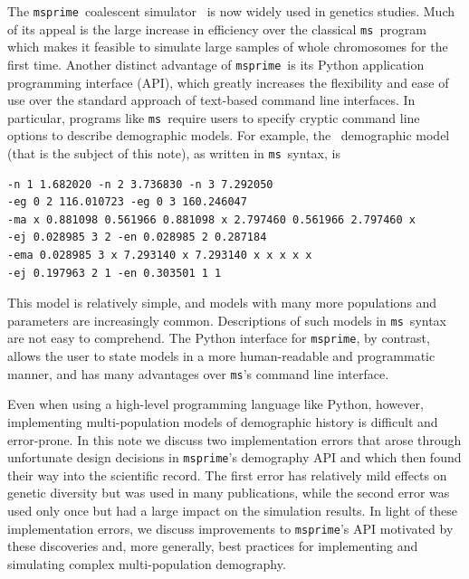 \documentclass{article}
\newcommand{\msprime}[0]{\texttt{msprime}}
\newcommand{\ms}[0]{\texttt{ms}}
\begin{document}
The \msprime\ coalescent
simulator~\citep{kelleher2016efficient,nelson2020accounting,kelleher2020coalescent}
is now widely used in genetics studies.
Much of its appeal is the large increase in efficiency over the classical
\ms\ program~\citep{hudson2002generating} which makes it feasible to simulate large
samples of whole chromosomes for the first time. Another distinct advantage
of \msprime\ is its Python application programming interface (API), which greatly
increases the flexibility and ease of use over the standard approach of
text-based command line interfaces.
In particular, programs like \ms\ require users to specify cryptic command
line options to describe demographic models.
For example, the~\citet{gutenkunst2009inferring} demographic model
(that is the subject of this note), as written
in \ms\ syntax, is
\begin{indent}
\begin{Verbatim}[xleftmargin=.5in]
-n 1 1.682020 -n 2 3.736830 -n 3 7.292050
-eg 0 2 116.010723 -eg 0 3 160.246047
-ma x 0.881098 0.561966 0.881098 x 2.797460 0.561966 2.797460 x
-ej 0.028985 3 2 -en 0.028985 2 0.287184
-ema 0.028985 3 x 7.293140 x 7.293140 x x x x x
-ej 0.197963 2 1 -en 0.303501 1 1
\end{Verbatim}
\end{indent}
\noindent This model is relatively simple,
and models with many more populations and parameters are increasingly
common. Descriptions of such models in \ms\ syntax are not easy to comprehend.
The Python interface for \msprime, by contrast, allows the user to
state models in a more human-readable and programmatic manner,
and has many advantages over \ms's command line interface.

Even when using a high-level programming language like Python, however,
implementing multi-population models
of demographic history is difficult and error-prone.
In this note we discuss two implementation errors that arose through
unfortunate design decisions in \msprime's demography API and which then found their way
into the scientific record. The first error has relatively mild effects on genetic diversity but was
used in many publications, while the second error was used only once but had a large impact on the
simulation results.
In light of these implementation errors, we discuss improvements to \msprime's API motivated by these
discoveries and, more generally, best practices for implementing and simulating complex multi-population
demography.
\end{document}
